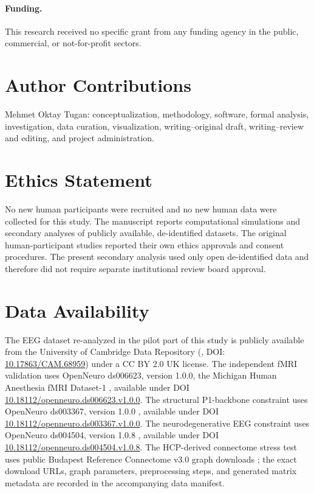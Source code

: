 \documentclass[11pt,a4paper]{article}
\theoremstyle{plain}
\theoremstyle{definition}
\theoremstyle{remark}
\begin{document}
\paragraph{Funding.} This research received no specific grant from any funding agency in the public, commercial, or not-for-profit sectors.

\section*{Author Contributions}

Mehmet Oktay Tugan: conceptualization, methodology, software, formal analysis, investigation, data curation, visualization, writing--original draft, writing--review and editing, and project administration.

\section*{Ethics Statement}

No new human participants were recruited and no new human data were collected for this study. The manuscript reports computational simulations and secondary analyses of publicly available, de-identified datasets. The original human-participant studies reported their own ethics approvals and consent procedures. The present secondary analysis used only open de-identified data and therefore did not require separate institutional review board approval.

\section*{Data Availability}

The EEG dataset re-analyzed in the pilot part of this study is publicly available from the University of Cambridge Data Repository (\citealp{chennu2016}, DOI: \href{https://doi.org/10.17863/CAM.68959}{10.17863/CAM.68959}) under a CC BY 2.0 UK license. The independent fMRI validation uses OpenNeuro ds006623, version 1.0.0, the Michigan Human Anesthesia fMRI Dataset-1 \citep{huang2026,huangopenneuro2025}, available under DOI \href{https://doi.org/10.18112/openneuro.ds006623.v1.0.0}{10.18112/openneuro.ds006623.v1.0.0}. The structural P1-backbone constraint uses OpenNeuro ds003367, version 1.0.0 \citep{snider2020,snideropenneuro2020}, available under DOI \href{https://doi.org/10.18112/openneuro.ds003367.v1.0.0}{10.18112/openneuro.ds003367.v1.0.0}. The neurodegenerative EEG constraint uses OpenNeuro ds004504, version 1.0.8 \citep{miltiadous2023}, available under DOI \href{https://doi.org/10.18112/openneuro.ds004504.v1.0.8}{10.18112/openneuro.ds004504.v1.0.8}. The HCP-derived connectome stress test uses public Budapest Reference Connectome v3.0 graph downloads \citep{szalkai2015,szalkai2017}; the exact download URLs, graph parameters, preprocessing steps, and generated matrix metadata are recorded in the accompanying data manifest.
\end{document}
